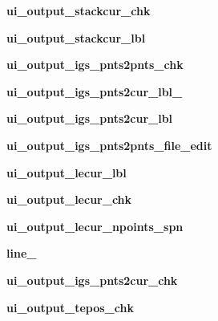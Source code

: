 \begin{DoxyCompactItemize}
\item 
\hypertarget{a00077_a60d8702dcef7ca077c25402d981a2ba9}{}\label{a00077_a60d8702dcef7ca077c25402d981a2ba9} 
{\bfseries ui\+\_\+output\+\_\+stackcur\+\_\+chk}
\item 
\hypertarget{a00077_abd1aece55a53a090e79fd1a7449d67b8}{}\label{a00077_abd1aece55a53a090e79fd1a7449d67b8} 
{\bfseries ui\+\_\+output\+\_\+stackcur\+\_\+lbl}
\item 
\hypertarget{a00077_a02aad1387d04c6ec5ad12e80a6a59d08}{}\label{a00077_a02aad1387d04c6ec5ad12e80a6a59d08} 
{\bfseries ui\+\_\+output\+\_\+igs\+\_\+pnts2pnts\+\_\+chk}
\item 
\hypertarget{a00077_a9a3e7b7353a08d8254630806f3466fc3}{}\label{a00077_a9a3e7b7353a08d8254630806f3466fc3} 
{\bfseries ui\+\_\+output\+\_\+igs\+\_\+pnts2cur\+\_\+lbl\+\_}
\item 
\hypertarget{a00077_a3a6ca0d33559a544c30ca69a584f5fb3}{}\label{a00077_a3a6ca0d33559a544c30ca69a584f5fb3} 
{\bfseries ui\+\_\+output\+\_\+igs\+\_\+pnts2cur\+\_\+lbl}
\item 
\hypertarget{a00077_acdf536fc7b4d652bfde2a129ac63af81}{}\label{a00077_acdf536fc7b4d652bfde2a129ac63af81} 
{\bfseries ui\+\_\+output\+\_\+igs\+\_\+pnts2pnts\+\_\+file\+\_\+edit}
\item 
\hypertarget{a00077_a47f948d0d305ed25b5d4199199348306}{}\label{a00077_a47f948d0d305ed25b5d4199199348306} 
{\bfseries ui\+\_\+output\+\_\+lecur\+\_\+lbl}
\item 
\hypertarget{a00077_af26afcf143419489f7a9c388f242550b}{}\label{a00077_af26afcf143419489f7a9c388f242550b} 
{\bfseries ui\+\_\+output\+\_\+lecur\+\_\+chk}
\item 
\hypertarget{a00077_afccfcfd87634348612a93710d25902d6}{}\label{a00077_afccfcfd87634348612a93710d25902d6} 
{\bfseries ui\+\_\+output\+\_\+lecur\+\_\+npoints\+\_\+spn}
\item 
\hypertarget{a00077_a9b081326a67dee3b6ab18d2aa0937b1a}{}\label{a00077_a9b081326a67dee3b6ab18d2aa0937b1a} 
{\bfseries line\+\_}
\item 
\hypertarget{a00077_a550f0dbb76e9a3094c1e38b46f5d885d}{}\label{a00077_a550f0dbb76e9a3094c1e38b46f5d885d} 
{\bfseries ui\+\_\+output\+\_\+igs\+\_\+pnts2cur\+\_\+chk}
\item 
\hypertarget{a00077_a1fd1e46b01841149ab493b773c6ee08c}{}\label{a00077_a1fd1e46b01841149ab493b773c6ee08c} 
{\bfseries ui\+\_\+output\+\_\+tepos\+\_\+chk}
\item 
\hypertarget{a00077_afc059e5843391ef3e3c56edb1f201cc0}{}\label{a00077_afc059e5843391ef3e3c56edb1f201cc0} 

\end{DoxyCompactItemize}
